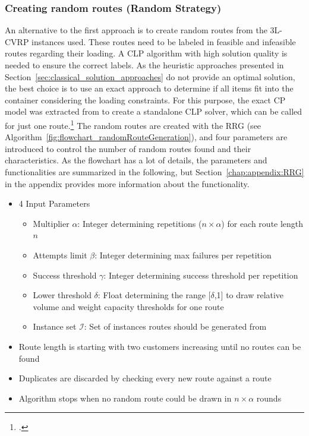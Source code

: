 \subsubsection{Creating random routes (Random Strategy)}
An alternative to the first approach is to create random routes from the \gls{3L-CVRP} instances used.
These routes need to be labeled in feasible and infeasible routes regarding their loading.
A \gls{CLP} algorithm with high solution quality is needed to ensure the correct labels. As the heuristic approaches
presented in Section~\ref{sec:classical_solution_approaches} do not provide an optimal solution,
the best choice is to use an exact approach to determine if all items fit into the container considering the loading constraints.
For this purpose, the exact \gls{CP} model was extracted from \cite{tamke_repository_2024} to create
a standalone \gls{CLP} solver, which can be called for just one route.\footcite[Stolen with permission from][]{tamke_repository_2024}
The random routes are created with the \gls{RRG} (see Algorithm~\ref{fig:flowchart_randomRouteGeneration}), and four parameters are introduced to
control the number of random routes found and their characteristics. As the flowchart has a lot of details, the parameters and
functionalities are summarized in the following, but Section~\ref{chap:appendix:RRG} in the appendix provides more information about
the functionality.

\begin{itemize}
    \item 4 Input Parameters
          \begin{itemize}
              \item Multiplier $\alpha$: Integer determining repetitions ($n\times\alpha$) for each route length $n$
              \item  Attempts limit $\beta$: Integer determining max failures per repetition
              \item  Success threshold $\gamma$: Integer determining success threshold per repetition
              \item  Lower threshold $\delta$: Float determining the range [$\delta$,1] to draw relative volume and weight capacity thresholds for one route
              \item Instance set $\mathcal{I}$: Set of instances routes should be generated from
          \end{itemize}
    \item Route length is starting with two customers increasing until no routes can be found
    \item Duplicates are discarded by checking every new route against a route
    \item Algorithm stops when no random route could be drawn in $n \times \alpha$ rounds
\end{itemize}

